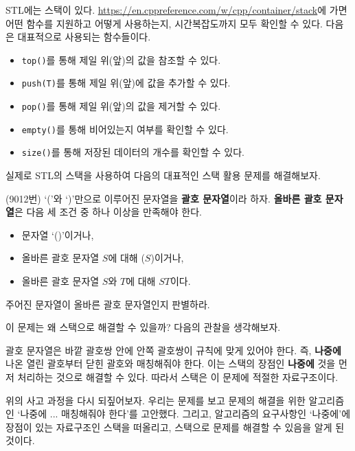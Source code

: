 STL에는 스택이 있다. \url{https://en.cppreference.com/w/cpp/container/stack}에 가면 어떤 함수를 지원하고 어떻게 사용하는지, 시간복잡도까지 모두 확인할 수 있다. 다음은 대표적으로 사용되는 함수들이다.

\begin{itemize}
    \item \texttt{top()}를 통해 제일 위(앞)의 값을 참조할 수 있다.
    \item \texttt{push(T)}를 통해 제일 위(앞)에 값을 추가할 수 있다.
    \item \texttt{pop()}를 통해 제일 위(앞)의 값을 제거할 수 있다.
    \item \texttt{empty()}를 통해 비어있는지 여부를 확인할 수 있다.
    \item \texttt{size()}를 통해 저장된 데이터의 개수를 확인할 수 있다.
\end{itemize}

실제로 STL의 스택을 사용하여 다음의 대표적인 스택 활용 문제를 해결해보자.

\begin{example} \label{ex: stack}
    (9012번) `('와 `)'만으로 이루어진 문자열을 \textbf{괄호 문자열}이라 하자. \textbf{올바른 괄호 문자열}은 다음 세 조건 중 하나 이상을 만족해야 한다.
    \begin{itemize}
        \item 문자열 `()'이거나,
        \item 올바른 괄호 문자열 $S$에 대해 ($S$)이거나,
        \item 올바른 괄호 문자열 $S$와 $T$에 대해 $ST$이다.
    \end{itemize}
    주어진 문자열이 올바른 괄호 문자열인지 판별하라.
\end{example}

이 문제는 왜 스택으로 해결할 수 있을까? 다음의 관찰을 생각해보자.

\begin{obs}
    괄호 문자열은 바깥 괄호쌍 안에 안쪽 괄호쌍이 규칙에 맞게 있어야 한다. 즉, \textbf{나중에} 나온 열린 괄호부터 닫힌 괄호와 매칭해줘야 한다. 이는 스택의 장점인 \textbf{나중에} 것을 먼저 처리하는 것으로 해결할 수 있다. 따라서 스택은 이 문제에 적절한 자료구조이다.    
\end{obs}

위의 사고 과정을 다시 되짚어보자. 우리는 문제를 보고 문제의 해결을 위한 알고리즘인 `나중에 ... 매칭해줘야 한다'를 고안했다. 그리고, 알고리즘의 요구사항인 `나중에'에 장점이 있는 자료구조인 스택을 떠올리고, 스택으로 문제를 해결할 수 있음을 알게 된 것이다.

